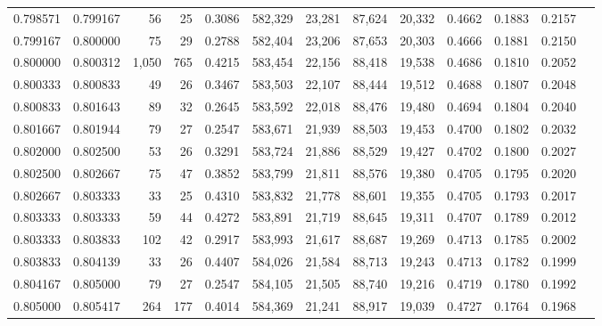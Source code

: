 \begin{tabular}{rrrrrrrrrrrrr}
0.798571 & 0.799167 &    56 &  25 &                                     0.3086 & 582,329 &  23,281 &  87,624 &  20,332 & 0.4662 & 0.1883 & 0.2157 \\
0.799167 & 0.800000 &    75 &  29 &                                     0.2788 & 582,404 &  23,206 &  87,653 &  20,303 & 0.4666 & 0.1881 & 0.2150 \\
0.800000 & 0.800312 & 1,050 & 765 &                                     0.4215 & 583,454 &  22,156 &  88,418 &  19,538 & 0.4686 & 0.1810 & 0.2052 \\
0.800333 & 0.800833 &    49 &  26 &                                     0.3467 & 583,503 &  22,107 &  88,444 &  19,512 & 0.4688 & 0.1807 & 0.2048 \\
0.800833 & 0.801643 &    89 &  32 &                                     0.2645 & 583,592 &  22,018 &  88,476 &  19,480 & 0.4694 & 0.1804 & 0.2040 \\
0.801667 & 0.801944 &    79 &  27 &                                     0.2547 & 583,671 &  21,939 &  88,503 &  19,453 & 0.4700 & 0.1802 & 0.2032 \\
0.802000 & 0.802500 &    53 &  26 &                                     0.3291 & 583,724 &  21,886 &  88,529 &  19,427 & 0.4702 & 0.1800 & 0.2027 \\
0.802500 & 0.802667 &    75 &  47 &                                     0.3852 & 583,799 &  21,811 &  88,576 &  19,380 & 0.4705 & 0.1795 & 0.2020 \\
0.802667 & 0.803333 &    33 &  25 &                                     0.4310 & 583,832 &  21,778 &  88,601 &  19,355 & 0.4705 & 0.1793 & 0.2017 \\
0.803333 & 0.803333 &    59 &  44 &                                     0.4272 & 583,891 &  21,719 &  88,645 &  19,311 & 0.4707 & 0.1789 & 0.2012 \\
0.803333 & 0.803833 &   102 &  42 &                                     0.2917 & 583,993 &  21,617 &  88,687 &  19,269 & 0.4713 & 0.1785 & 0.2002 \\
0.803833 & 0.804139 &    33 &  26 &                                     0.4407 & 584,026 &  21,584 &  88,713 &  19,243 & 0.4713 & 0.1782 & 0.1999 \\
0.804167 & 0.805000 &    79 &  27 &                                     0.2547 & 584,105 &  21,505 &  88,740 &  19,216 & 0.4719 & 0.1780 & 0.1992 \\
0.805000 & 0.805417 &   264 & 177 &                                     0.4014 & 584,369 &  21,241 &  88,917 &  19,039 & 0.4727 & 0.1764 & 0.1968 \\

\end{tabular}
